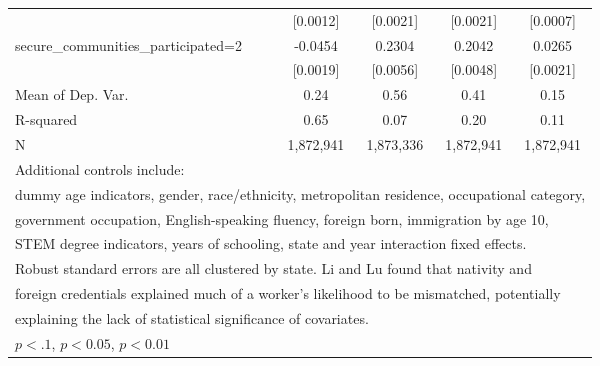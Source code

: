 \begin{table}[htbp]
\begin{tabular}{l*{4}{c}}
                    &    [0.0012]         &    [0.0021]         &    [0.0021]         &    [0.0007]         \\
\addlinespace
secure\_communities\_participated=2&     -0.0454\sym{***}&      0.2304\sym{***}&      0.2042\sym{***}&      0.0265\sym{***}\\
                    &    [0.0019]         &    [0.0056]         &    [0.0048]         &    [0.0021]         \\
\midrule
Mean of Dep. Var.   &        0.24         &        0.56         &        0.41         &        0.15         \\
R-squared           &        0.65         &        0.07         &        0.20         &        0.11         \\
N                   &   1,872,941         &   1,873,336         &   1,872,941         &   1,872,941         \\
\bottomrule
\multicolumn{5}{l}{\footnotesize Additional controls include:}\\
\multicolumn{5}{l}{\footnotesize dummy age indicators, gender, race/ethnicity, metropolitan residence, occupational category,}\\
\multicolumn{5}{l}{\footnotesize government occupation, English-speaking fluency, foreign born, immigration by age 10,}\\
\multicolumn{5}{l}{\footnotesize STEM degree indicators, years of schooling, state and year interaction fixed effects.}\\
\multicolumn{5}{l}{\footnotesize Robust standard errors are all clustered by state. Li and Lu found that nativity and}\\
\multicolumn{5}{l}{\footnotesize foreign credentials explained much of a worker's likelihood to be mismatched, potentially}\\
\multicolumn{5}{l}{\footnotesize explaining the lack of statistical significance of covariates.}\\
\multicolumn{5}{l}{\footnotesize \sym{*} \(p<.1\), \sym{**} \(p<0.05\), \sym{***} \(p<0.01\)}\\
\end{tabular}
\end{table}
